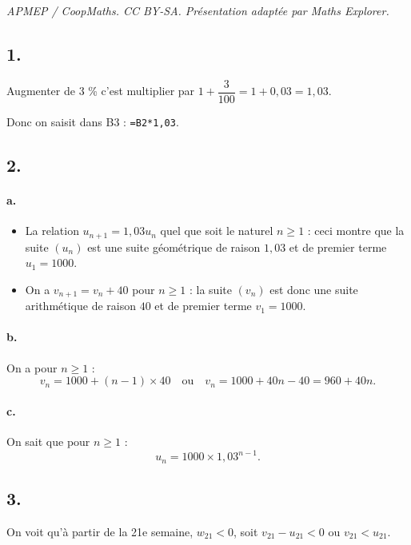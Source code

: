 \documentclass[10pt]{article}
\begin{document}
\noindent\textit{APMEP / CoopMaths. CC BY-SA. Présentation adaptée par Maths Explorer.}\par\medskip
\subsection*{1.}

Augmenter de 3 \% c'est multiplier par \(1 + \dfrac{3}{100} = 1 + 0{,}03 = 1{,}03\).

Donc on saisit dans B3 : \texttt{=B2*1,03}.

\subsection*{2.}

\paragraph{a.}
\begin{itemize}
    \item La relation \( u_{n+1} = 1{,}03 u_n \) quel que soit le naturel \(n \geqslant 1\) : ceci montre que la suite \((u_n)\) est une suite géométrique de raison \(1{,}03\) et de premier terme \(u_1 = 1000\).
    \item On a \( v_{n+1} = v_n + 40 \) pour \(n \geqslant 1\) : la suite \((v_n)\) est donc une suite arithmétique de raison \(40\) et de premier terme \(v_1 = 1000\).
\end{itemize}

\paragraph{b.} On a pour \(n \geqslant 1\) :
\[
v_n = 1000 + (n - 1) \times 40 \quad \text{ou} \quad v_n = 1000 + 40n - 40 = 960 + 40n.
\]

\paragraph{c.} On sait que pour \(n \geqslant 1\) :
\[
u_n = 1000 \times 1{,}03^{n-1}.
\]

\subsection*{3.}

On voit qu'à partir de la 21e semaine, \(w_{21} < 0\), soit \(v_{21} - u_{21} < 0\) ou \(v_{21} < u_{21}\).
\end{document}
